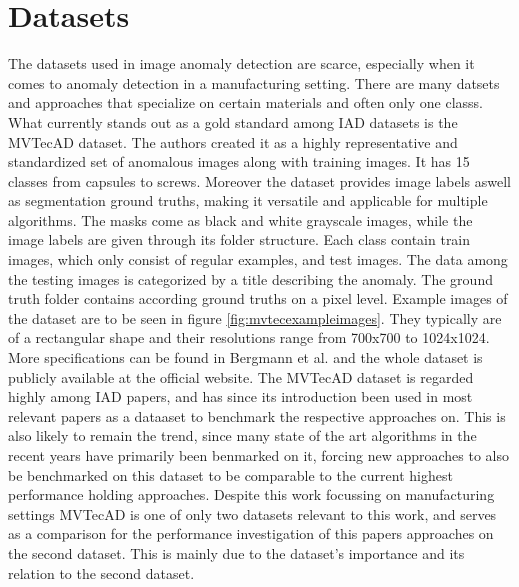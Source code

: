 \section{Datasets}
\label{sec:datasets}
The datasets used in image anomaly detection are scarce, especially when it comes to anomaly detection in a manufacturing setting. There are many datsets and approaches that specialize on certain materials \cite{FabricDataset_Tsang_2016} 
\cite{SteeltubeDataset_Yang_2021} \cite{magnetictiles_Huang_2018}
and often only one classs. What currently stands out as a gold standard among IAD datasets is the MVTecAD \cite{MVTEC_Bergmann_2021} dataset. The authors created it  
as a highly representative and standardized set of anomalous images along with training images. It has 15 classes from capsules to screws. Moreover the dataset provides image labels aswell as segmentation 
ground truths, making it versatile and applicable for multiple algorithms. The masks come as black and white grayscale images, while the image labels are given through its folder structure. 
Each class contain train images, which only consist of regular examples, 
and test images. The data among the testing images is categorized by a title describing the anomaly. The ground truth folder contains 
according ground truths on a pixel level.\newline
Example images of the dataset are to be seen in figure \ref{fig:mvtecexampleimages}. They typically are of a rectangular shape and their resolutions range from 
700x700 to 1024x1024. More specifications can be found in Bergmann et al. \cite{MVTEC_Bergmann_2021} and the whole dataset is publicly available at the official website\cite{mvtecdownload}.\newline
The MVTecAD\cite{MVTEC_Bergmann_2021} dataset is regarded highly among IAD papers, and has since its introduction been used in most relevant papers as a dataaset 
to benchmark the respective approaches on. This is also likely to remain the trend, since many state of the art algorithms in the recent years have primarily been benmarked on it, forcing new approaches 
to also be benchmarked on this dataset to be comparable to the current highest performance holding approaches. Despite this work focussing on manufacturing settings MVTecAD is one of only two datasets relevant to this work, 
and serves as a comparison for the performance investigation of this papers approaches on the second dataset. This is mainly due to the dataset's importance and 
its relation to the second dataset.



